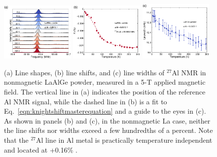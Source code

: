 \documentclass[aps,prb,a4paper,10pt,twocolumn,showpacs,floatfix,superscriptaddress,preprintnumbers,longbibliography]{revtex4-2}
\begin{document}
%
\begin{figure}[!bht]
	\centering 
	\includegraphics[width=0.32\textwidth,angle=0]{figures/LaAlGe_Powder/LaAlGe_powder_lines_vs_temp} 
	\includegraphics[width=0.32\textwidth]{figures/LaAlGe_Powder/gaussianshiftperc}%
	\includegraphics[width=0.32\textwidth]{figures/LaAlGe_Powder/gaussianwidth}%
	\caption{\label{fig:LaAlGe}(a) Line shapes, (b) line shifts,  and (c) line widths of $^{27}$Al 
	NMR in nonmagnetic LaAlGe powder, measured in a 5-T applied magnetic field. 
	The vertical line in (a) indicates the position of the reference Al NMR signal, %
	while the dashed line in (b) is a fit to Eq.~\eqref{eqn:knightshiftmasterequation} 
	and a guide to the eyes in (c). As shown in panels (b) and (c), 
	in the nonmagnetic La case, neither the line shifts nor widths exceed 
	a few hundredths of a percent. Note that the $^{27}$Al line in Al metal
	is practically temperature independent and located at +0.16\% \cite{Knight1949}.} %
\end{figure}
%
\end{document}
